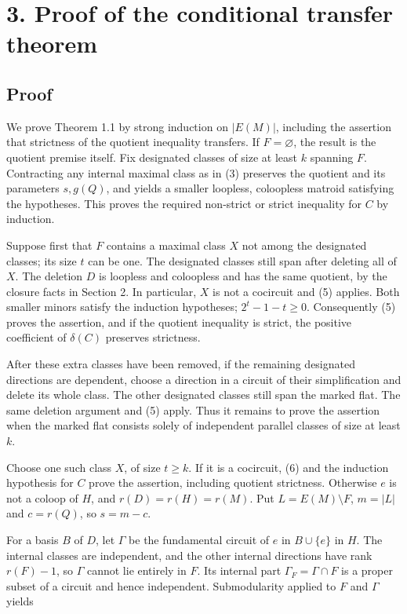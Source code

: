 \documentclass[11pt]{article}
\begin{document}
\section*{3. Proof of the conditional transfer theorem}

\subsection*{Proof}

We prove Theorem 1.1 by strong induction on \(|E(M)|\), including the assertion that strictness of the quotient inequality transfers. If \(F=\varnothing\), the result is the quotient premise itself. Fix designated classes of size at least \(k\) spanning \(F\). Contracting any internal maximal class as in (3) preserves the quotient and its parameters \(s,g(Q)\), and yields a smaller loopless, coloopless matroid satisfying the hypotheses. This proves the required non-strict or strict inequality for \(C\) by induction.

Suppose first that \(F\) contains a maximal class \(X\) not among the designated classes; its size \(t\) can be one. The designated classes still span after deleting all of \(X\). The deletion \(D\) is loopless and coloopless and has the same quotient, by the closure facts in Section 2. In particular, \(X\) is not a cocircuit and (5) applies. Both smaller minors satisfy the induction hypotheses; \(2^t-1-t\ge0\). Consequently (5) proves the assertion, and if the quotient inequality is strict, the positive coefficient of \(\delta(C)\) preserves strictness.

After these extra classes have been removed, if the remaining designated directions are dependent, choose a direction in a circuit of their simplification and delete its whole class. The other designated classes still span the marked flat. The same deletion argument and (5) apply. Thus it remains to prove the assertion when the marked flat consists solely of independent parallel classes of size at least \(k\).

Choose one such class \(X\), of size \(t\ge k\). If it is a cocircuit, (6) and the induction hypothesis for \(C\) prove the assertion, including quotient strictness. Otherwise \(e\) is not a coloop of \(H\), and \(r(D)=r(H)=r(M)\). Put \(L=E(M)\setminus F\), \(m=|L|\) and \(c=r(Q)\), so \(s=m-c\).

For a basis \(B\) of \(D\), let \(\Gamma\) be the fundamental circuit of \(e\) in \(B\cup\{e\}\) in \(H\). The internal classes are independent, and the other internal directions have rank \(r(F)-1\), so \(\Gamma\) cannot lie entirely in \(F\). Its internal part \(\Gamma_F=\Gamma\cap F\) is a proper subset of a circuit and hence independent. Submodularity applied to \(F\) and \(\Gamma\) yields
\end{document}
